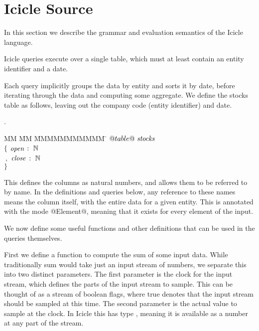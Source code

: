 \section{Icicle Source}
\label{s:Source}

In this section we describe the grammar and evaluation semantics of the Icicle language.

Icicle queries execute over a single table, which must at least contain an entity identifier and a date. 

Each query implicitly groups the data by entity and sorts it by date, before iterating through the data and computing some aggregate.
We define the stocks table as follows, leaving out the company code (entity identifier) and date.

.
\begin{tabbing}
MM \= MM \= MMMMMMMMMMM \= \kill
$@table@~\mathit{stocks}$    \\
$\{$ \> $\mathit{open}$ \> $:~\mathbb{N}$ \\
$~,$ \> $\mathit{close}$ \> $:~\mathbb{N}$ \\
$\}$
\end{tabbing}

This defines the columns as natural numbers, and allows them to be referred to by name.
In the definitions and queries below, any reference to these names means the column itself, with the entire data for a given entity.
This is annotated with the mode @Element@, meaning that it exists for every element of the input.

We now define some useful functions and other definitions that can be used in the queries themselves.

First we define a function to compute the sum of some input data.
While traditionally sum would take just an input stream of numbers, we separate this into two distinct parameters.
The first parameter is the clock for the input stream, which defines the parts of the input stream to sample.
This can be thought of as a stream of boolean flags, where true denotes that the input stream should be sampled at this time.
The second parameter is the actual value to sample at the clock.
In Icicle this has type , meaning it is available as a number at any part of the stream.

